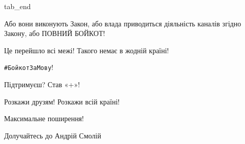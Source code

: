   tab_end
\fi

Або вони виконують Закон, або влада приводиться діяльність каналів згідно
Закону, або ПОВНИЙ БОЙКОТ! 

Це перейшло всі межі! Такого немає в жодній країні! 

\verb|#БойкотЗаМову|! 

Підтримуєш? Став «+»! 

Розкажи друзям! Розкажи всій країні! 

Максимальне поширення!

Долучайтесь до Андрій Смолій

